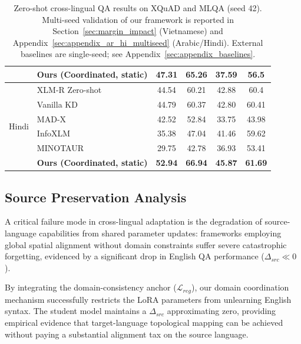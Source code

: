 \documentclass[11pt]{article}
\begin{document}
\begin{table}[t]
\begin{tabular}{llcccc}
 & \textbf{Ours (Coordinated, static)} & \textbf{47.31} & \textbf{65.26} & \textbf{37.59} & \textbf{56.5} \\
\midrule
\multirow{6}{*}{Hindi}
 & XLM-R Zero-shot & 44.54 & 60.21 & 42.88 & 60.4 \\
 & Vanilla KD \citep{hinton2015distillingknowledgeneuralnetwork} & 44.79 & 60.37 & 42.80 & 60.41 \\
 & MAD-X \citep{pfeiffer-etal-2020-mad} & 42.52 & 52.84 & 33.75 & 43.98 \\
 & InfoXLM \citep{chi-etal-2021-infoxlm} & 35.38 & 47.04 & 41.46 & 59.62 \\
 & MINOTAUR \citep{sherborne-etal-2023-optimal} & 29.75 & 42.78 & 36.93 & 53.41 \\
 & \textbf{Ours (Coordinated, static)} & \textbf{52.94} & \textbf{66.94} & \textbf{45.87} & \textbf{61.69} \\
\bottomrule
\end{tabular}
\caption{Zero-shot cross-lingual QA results on XQuAD and MLQA (seed 42). Multi-seed validation of our framework is reported in Section~\ref{sec:margin_impact} (Vietnamese) and Appendix~\ref{sec:appendix_ar_hi_multiseed} (Arabic/Hindi). External baselines are single-seed; see Appendix~\ref{sec:appendix_baselines}.}
\label{tab:main_results}
\end{table}

\subsection{Source Preservation Analysis}
A critical failure mode in cross-lingual adaptation is the degradation of source-language capabilities from shared parameter updates: frameworks employing global spatial alignment without domain constraints suffer severe catastrophic forgetting, evidenced by a significant drop in English QA performance ($\Delta_{src} \ll 0$). 

By integrating the domain-consistency anchor ($\mathcal{L}_{reg}$), our domain coordination mechanism successfully restricts the LoRA parameters from unlearning English syntax. The student model maintains a $\Delta_{src}$ approximating zero, providing empirical evidence that target-language topological mapping can be achieved without paying a substantial alignment tax on the source language.
\end{document}
